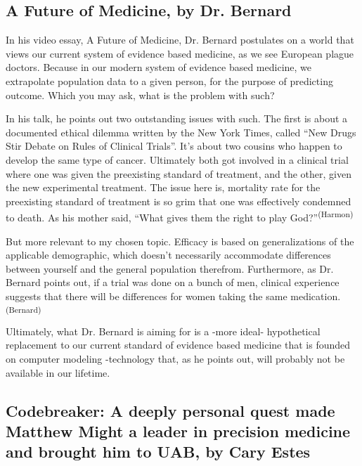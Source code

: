 \subsection{A Future of Medicine, by Dr. Bernard}


In his video essay, A Future of Medicine, Dr. Bernard postulates on a world that views our current system of evidence based medicine, as we see European plague doctors. Because in our modern system of evidence based medicine, we extrapolate population data to a given person, for the purpose of predicting outcome. Which you may ask, what is the problem with such? 

In his talk, he points out two outstanding issues with such. The first is about a documented ethical dilemma written by the New York Times, called ``New Drugs Stir Debate on Rules of Clinical Trials''. It's about two cousins who happen to develop the same type of cancer. Ultimately both got involved in a clinical trial where one was given the preexisting standard of treatment, and the other, given the new experimental treatment. The issue here is, mortality rate for the preexisting standard of treatment is so grim that one was effectively condemned to death. As his mother said, ``What gives them the right to play God?''\textsuperscript{(Harmon)}

But more relevant to my chosen topic. Efficacy is based on generalizations of the applicable demographic, which doesn’t necessarily accommodate differences between yourself and the general population therefrom. Furthermore, as Dr. Bernard points out, if a trial was done on a bunch of men, clinical experience suggests that there will be differences for women taking the same medication.\textsuperscript{(Bernard)}

Ultimately, what Dr. Bernard is aiming for is a -more ideal- hypothetical replacement to our current standard of evidence based medicine that is founded on computer modeling -technology that, as he points out, will probably not be available in our lifetime.


\subsection{Codebreaker: A deeply personal quest made Matthew Might a leader in precision medicine and brought him to UAB, by Cary Estes}


